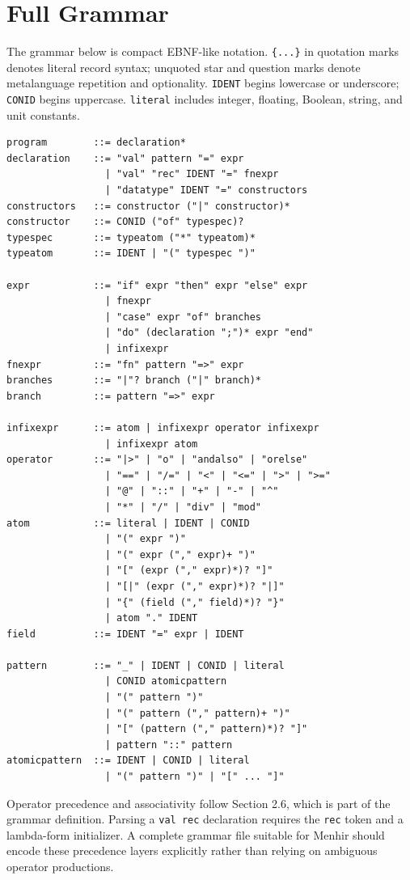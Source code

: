 \documentclass[11pt,oneside,openany]{book}
\newcommand{\kw}[1]{\texttt{#1}}
\begin{document}
\chapter{Full Grammar}
\label{app:grammar}
The grammar below is compact EBNF-like notation. \kw{\{...\}} in quotation marks denotes literal record syntax; unquoted star and question marks denote metalanguage repetition and optionality. \kw{IDENT} begins lowercase or underscore; \kw{CONID} begins uppercase. \kw{literal} includes integer, floating, Boolean, string, and unit constants.

\begin{lstlisting}[language={}]
program        ::= declaration*
declaration    ::= "val" pattern "=" expr
                 | "val" "rec" IDENT "=" fnexpr
                 | "datatype" IDENT "=" constructors
constructors   ::= constructor ("|" constructor)*
constructor    ::= CONID ("of" typespec)?
typespec       ::= typeatom ("*" typeatom)*
typeatom       ::= IDENT | "(" typespec ")"

expr           ::= "if" expr "then" expr "else" expr
                 | fnexpr
                 | "case" expr "of" branches
                 | "do" (declaration ";")* expr "end"
                 | infixexpr
fnexpr         ::= "fn" pattern "=>" expr
branches       ::= "|"? branch ("|" branch)*
branch         ::= pattern "=>" expr

infixexpr      ::= atom | infixexpr operator infixexpr
                 | infixexpr atom
operator       ::= "|>" | "o" | "andalso" | "orelse"
                 | "==" | "/=" | "<" | "<=" | ">" | ">="
                 | "@" | "::" | "+" | "-" | "^"
                 | "*" | "/" | "div" | "mod"
atom           ::= literal | IDENT | CONID
                 | "(" expr ")"
                 | "(" expr ("," expr)+ ")"
                 | "[" (expr ("," expr)*)? "]"
                 | "[|" (expr ("," expr)*)? "|]"
                 | "{" (field ("," field)*)? "}"
                 | atom "." IDENT
field          ::= IDENT "=" expr | IDENT

pattern        ::= "_" | IDENT | CONID | literal
                 | CONID atomicpattern
                 | "(" pattern ")"
                 | "(" pattern ("," pattern)+ ")"
                 | "[" (pattern ("," pattern)*)? "]"
                 | pattern "::" pattern
atomicpattern  ::= IDENT | CONID | literal
                 | "(" pattern ")" | "[" ... "]"
\end{lstlisting}

Operator precedence and associativity follow Section 2.6, which is part of the grammar definition. Parsing a \kw{val rec} declaration requires the \kw{rec} token and a lambda-form initializer. A complete grammar file suitable for Menhir should encode these precedence layers explicitly rather than relying on ambiguous operator productions.
\end{document}
